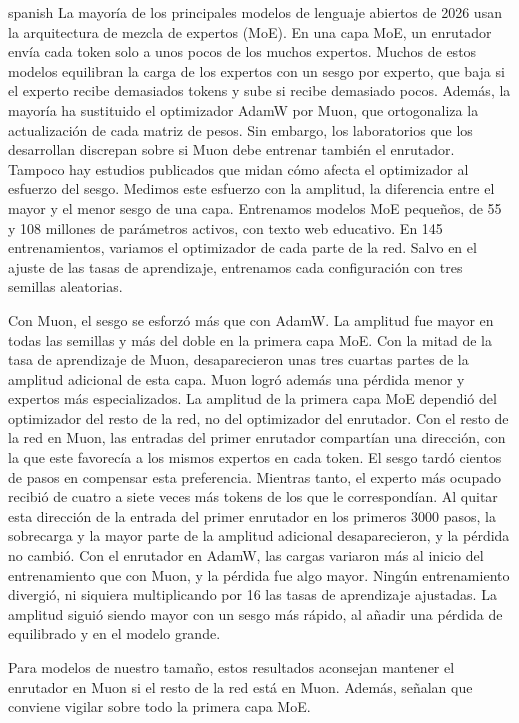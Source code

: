\begin{hyphenrules}{spanish}
La mayoría de los principales modelos de lenguaje abiertos de 2026 usan la arquitectura de mezcla de expertos (MoE)\@. En una capa MoE, un enrutador envía cada token solo a unos pocos de los muchos expertos. Muchos de estos modelos equilibran la carga de los expertos con un sesgo por experto, que baja si el experto recibe demasiados tokens y sube si recibe demasiado pocos. Además, la mayoría ha sustituido el optimizador AdamW por Muon, que ortogonaliza la actualización de cada matriz de pesos. Sin embargo, los laboratorios que los desarrollan discrepan sobre si Muon debe entrenar también el enrutador. Tampoco hay estudios publicados que midan cómo afecta el optimizador al esfuerzo del sesgo. Medimos este esfuerzo con la amplitud, la diferencia entre el mayor y el menor sesgo de una capa. Entrenamos modelos MoE pequeños, de 55 y 108 millones de parámetros activos, con texto web educativo. En 145 entrenamientos, variamos el optimizador de cada parte de la red. Salvo en el ajuste de las tasas de aprendizaje, entrenamos cada configuración con tres semillas aleatorias.

Con Muon, el sesgo se esforzó más que con AdamW\@. La amplitud fue mayor en todas las semillas y más del doble en la primera capa MoE\@. Con la mitad de la tasa de aprendizaje de Muon, desaparecieron unas tres cuartas partes de la amplitud adicional de esta capa. Muon logró además una pérdida menor y expertos más especializados. La amplitud de la primera capa MoE dependió del optimizador del resto de la red, no del optimizador del enrutador. Con el resto de la red en Muon, las entradas del primer enrutador compartían una dirección, con la que este favorecía a los mismos expertos en cada token. El sesgo tardó cientos de pasos en compensar esta preferencia. Mientras tanto, el experto más ocupado recibió de cuatro a siete veces más tokens de los que le correspondían. Al quitar esta dirección de la entrada del primer enrutador en los primeros 3000 pasos, la sobrecarga y la mayor parte de la amplitud adicional desaparecieron, y la pérdida no cambió. Con el enrutador en AdamW, las cargas variaron más al inicio del entrenamiento que con Muon, y la pérdida fue algo mayor. Ningún entrenamiento divergió, ni siquiera multiplicando por 16 las tasas de aprendizaje ajustadas. La amplitud siguió siendo mayor con un sesgo más rápido, al añadir una pérdida de equilibrado y en el modelo grande.

Para modelos de nuestro tamaño, estos resultados aconsejan mantener el enrutador en Muon si el resto de la red está en Muon. Además, señalan que conviene vigilar sobre todo la primera capa MoE.
\end{hyphenrules}
